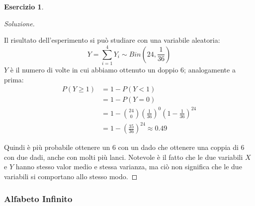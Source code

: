 \documentclass{article}
\theoremstyle{plain}
\theoremstyle{definition}
\newtheorem{esercizio}{Esercizio}[section]
\theoremstyle{remark}
\newenvironment{soluzione}
	{\renewcommand\qedsymbol{$\mathwitch*$}\begin{proof}[Soluzione]}
	{\end{proof}}
\renewcommand{\qedsymbol}{$\mathrightghost$}
\begin{document}
\begin{esercizio}
\begin{soluzione}
\begin{itemize}
			Il risultato dell'esperimento si può studiare con una variabile aleatoria:
			\begin{equation*}
				Y=\sum_{i=1}^4Y_i\sim Bin\left(24,\frac{1}{36}\right)
			\end{equation*}
			$Y$ è il numero di volte in cui abbiamo ottenuto un doppio 6; analogamente a prima:
			\begin{align*}
				P(Y\geq 1)&=1-P(Y<1)\\
				&=1-P(Y=0)\\
				&=1-\binom{24}{0}\left(\frac{1}{36}\right)^0\left(1-\frac{1}{36}\right)^{24}\\
				&=1-\left(\frac{35}{36}\right)^{24}\approx0.49
			\end{align*}
		\end{itemize}
		Quindi è più probabile ottenere un 6 con un dado che ottenere una coppia di 6 con due dadi, anche con molti più lanci. Notevole è il fatto che le due variabili $X$ e $Y$ hanno stesso valor medio e stessa varianza, ma ciò non significa che le due variabili si comportano allo stesso modo.
	\end{soluzione}
\end{esercizio}
\subsubsection{Alfabeto Infinito} %
\label{ssub:alfabeto_infinito}
\end{document}
